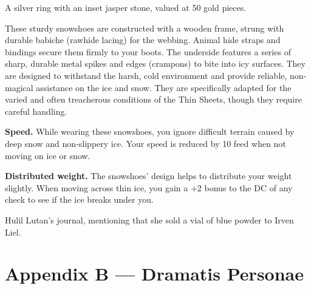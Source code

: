 \documentclass[
  letterpaper,12pt,twoside,twocolumn,openany,
  nodeprecatedcode,bg=full]{dndbook}
\begin{document}

A silver ring with an inset jasper stone, valued at 50 gold pieces.


These sturdy snowshoes are constructed with a wooden frame, strung with
durable babiche (rawhide lacing) for the webbing. Animal hide straps and
bindings secure them firmly to your boots. The underside features a
series of sharp, durable metal spikes and edges (crampons) to bite into
icy surfaces. They are designed to withstand the harsh, cold environment
and provide reliable, non-magical assistance on the ice and snow. They
are specifically adapted for the varied and often treacherous conditions
of the Thin Sheets, though they require careful handling.

\textbf{Speed.} While wearing these snowshoes, you ignore difficult
terrain caused by deep snow and non-slippery ice. Your speed is reduced
by 10 feed when not moving on ice or snow.

\textbf{Distributed weight.} The snowshoes' design helps to distribute
your weight slightly. When moving across thin ice, you gain a +2 bonus
to the DC of any check to see if the ice breaks under you.


Hulil Lutan's journal, mentioning that she sold a vial of blue powder to
Irven Liel.

\chapter{Appendix B --- Dramatis
Personae}\label{appendix-b-dramatis-personae}
\end{document}
